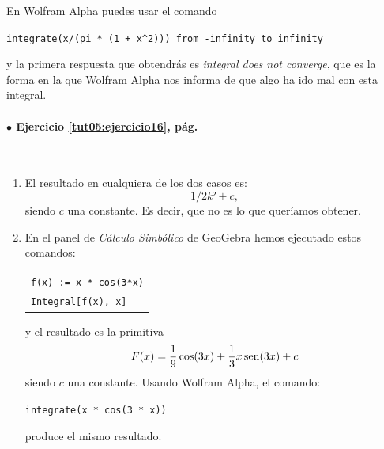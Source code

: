 \documentclass[10pt,a4paper]{article}\usepackage[]{graphicx}\usepackage[]{color}
\begin{document}
\begin{enumerate}
   En Wolfram Alpha puedes usar el comando
   \begin{center}
     \verb#integrate(x/(pi * (1 + x^2))) from -infinity to infinity#
   \end{center}
   y la primera respuesta que obtendrás es {\em integral does not converge}, que es la forma en la que Wolfram Alpha nos informa de que algo ha ido mal con esta integral.
\end{enumerate}

\paragraph{\bf $\bullet$ Ejercicio \ref{tut05:ejercicio16}, pág. \pageref{tut05:ejercicio16}}
\label{tut05:ejercicio16:sol}\quad\\
\begin{enumerate}
  \item El resultado en cualquiera de los dos casos es:
    \[1 / 2 k² + c,\]
    siendo $c$ una constante. Es decir, que no es lo que queríamos obtener.

  \item En el panel de {\em Cálculo Simbólico} de GeoGebra hemos ejecutado estos comandos:
  \begin{center}
    \begin{tabular}{l}
       {\tt f(x) := x * cos(3*x)}\\
       {\tt Integral[f(x), x]}
    \end{tabular}
  \end{center}
  y el resultado es la primitiva
  \[F(x) = \frac{1}{9} \cos(3x) + \frac{1}{3}x \operatorname{sen}(3x) + c\]
  siendo $c$ una constante.  Usando Wolfram Alpha, el comando:
  \begin{center}
    {\tt integrate(x * cos(3 * x))}
  \end{center}
  produce el mismo resultado.


\end{enumerate}
\end{document}
